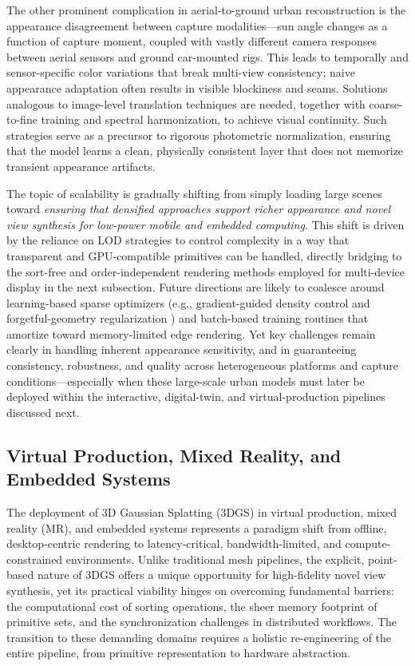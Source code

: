 \documentclass[11pt,a4paper]{article}
\begin{document}
The other prominent complication in aerial-to-ground urban reconstruction is the appearance disagreement between capture modalities---sun angle changes as a function of capture moment, coupled with vastly different camera responses between aerial sensors and ground car-mounted rigs. This leads to temporally and sensor-specific color variations that break multi-view consistency; naive appearance adaptation often results in visible blockiness and seams. Solutions analogous to image-level translation techniques \cite{arxiv:2501.10788v1} are needed, together with coarse-to-fine training and spectral harmonization, to achieve visual continuity. Such strategies serve as a precursor to rigorous photometric normalization, ensuring that the model learns a clean, physically consistent layer that does not memorize transient appearance artifacts.

The topic of scalability is gradually shifting from simply loading large scenes toward \emph{ensuring that densified approaches support richer appearance and novel view synthesis for low-power mobile and embedded computing}. This shift is driven by the reliance on LOD strategies to control complexity in a way that transparent and GPU-compatible primitives can be handled, directly bridging to the sort-free and order-independent rendering methods employed for multi-device display in the next subsection. Future directions are likely to coalesce around learning-based sparse optimizers (e.g., gradient-guided density control and forgetful-geometry regularization \cite{arxiv:2507.00363v1,arxiv:2406.17074v1}) and batch-based training routines that amortize toward memory-limited edge rendering. Yet key challenges remain clearly in handling inherent appearance sensitivity, and in guaranteeing consistency, robustness, and quality across heterogeneous platforms and capture conditions---especially when these large-scale urban models must later be deployed within the interactive, digital-twin, and virtual-production pipelines discussed next.


\subsection{Virtual Production, Mixed Reality, and Embedded Systems}


The deployment of 3D Gaussian Splatting (3DGS) in virtual production, mixed reality (MR), and embedded systems represents a paradigm shift from offline, desktop-centric rendering to latency-critical, bandwidth-limited, and compute-constrained environments. Unlike traditional mesh pipelines, the explicit, point-based nature of 3DGS offers a unique opportunity for high-fidelity novel view synthesis, yet its practical viability hinges on overcoming fundamental barriers: the computational cost of sorting operations, the sheer memory footprint of primitive sets, and the synchronization challenges in distributed workflows. The transition to these demanding domains requires a holistic re-engineering of the entire pipeline, from primitive representation to hardware abstraction.
\end{document}
